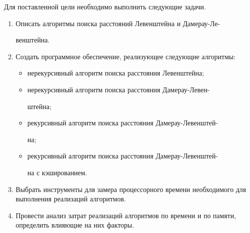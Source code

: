 Для поставленной цели необходимо выполнить следующие задачи.
\begin{enumerate}[label={\arabic*)}]
	\item Описать алгоритмы поиска расстояний Левенштейна и Дамерау-Ле-

	венштейна.
	\item Создать программное обеспечение, реализующее следующие алгоритмы:
	\begin{itemize}[label=---]
		\item нерекурсивный алгоритм поиска расстояния Левенштейна;
		\item нерекурсивный алгоритм поиска расстояния Дамерау-Левен-

		штейна;
		\item рекурсивный алгоритм поиска расстояния Дамерау-Левенштей-

		на;
		\item рекурсивный алгоритм поиска расстояния Дамерау-Левенштей-

		на с кэшированием.
	\end{itemize}
	\item Выбрать инструменты для замера процессорного времени необходимого для выполнения реализаций алгоритмов.
	\item Провести анализ затрат реализаций алгоритмов по времени и по памяти, определить влияющие на них факторы.
\end{enumerate}

